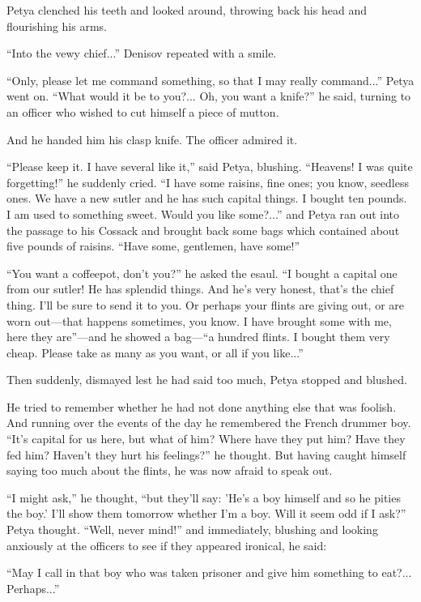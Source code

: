 Petya clenched his teeth and looked around, throwing back his
head and flourishing his arms.

``Into the vewy chief...'' Denisov repeated with a smile.

``Only, please let me command something, so that I may really
command...''  Petya went on. ``What would it be to you?... Oh,
you want a knife?'' he said, turning to an officer who wished to
cut himself a piece of mutton.

And he handed him his clasp knife. The officer admired it.

``Please keep it. I have several like it,'' said Petya, blushing.
``Heavens! I was quite forgetting!'' he suddenly cried. ``I have
some raisins, fine ones; you know, seedless ones. We have a new
sutler and he has such capital things. I bought ten pounds. I am
used to something sweet. Would you like some?...'' and Petya ran
out into the passage to his Cossack and brought back some bags
which contained about five pounds of raisins. ``Have some,
gentlemen, have some!''

``You want a coffeepot, don't you?'' he asked the esaul. ``I
bought a capital one from our sutler! He has splendid things. And
he's very honest, that's the chief thing. I'll be sure to send it
to you. Or perhaps your flints are giving out, or are worn
out---that happens sometimes, you know. I have brought some with
me, here they are''---and he showed a bag---``a hundred flints. I
bought them very cheap. Please take as many as you want, or all
if you like...''

Then suddenly, dismayed lest he had said too much, Petya stopped
and blushed.

He tried to remember whether he had not done anything else that
was foolish. And running over the events of the day he remembered
the French drummer boy. ``It's capital for us here, but what of
him? Where have they put him? Have they fed him? Haven't they
hurt his feelings?'' he thought.  But having caught himself
saying too much about the flints, he was now afraid to speak out.

``I might ask,'' he thought, ``but they'll say: 'He's a boy
himself and so he pities the boy.' I'll show them tomorrow
whether I'm a boy. Will it seem odd if I ask?'' Petya
thought. ``Well, never mind!'' and immediately, blushing and
looking anxiously at the officers to see if they appeared
ironical, he said:

``May I call in that boy who was taken prisoner and give him
something to eat?... Perhaps...''

